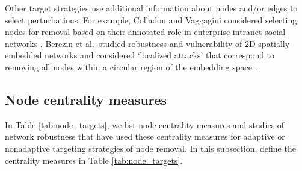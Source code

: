 \documentclass{comnet-mod}
\begin{document}
Other target strategies use additional information about nodes and/or edges to select perturbations. For example, Colladon and Vaggagini considered selecting nodes for removal based on their annotated role in enterprise intranet social networks \cite{Colladon2017}. Berezin et al.~studied robustness and vulnerability of 2D spatially embedded networks and considered `localized attacks' that correspond to removing all nodes within a circular region of the embedding space \cite{Berezin2015}.


\subsection{Node centrality measures}\label{sec:node_centralities}

In Table \ref{tab:node_targets}, we list node centrality measures and studies of network robustness that have used these centrality measures for adaptive or nonadaptive targeting strategies of node removal. In this subsection, define the centrality measures in Table \ref{tab:node_targets}.
 
\end{document}
